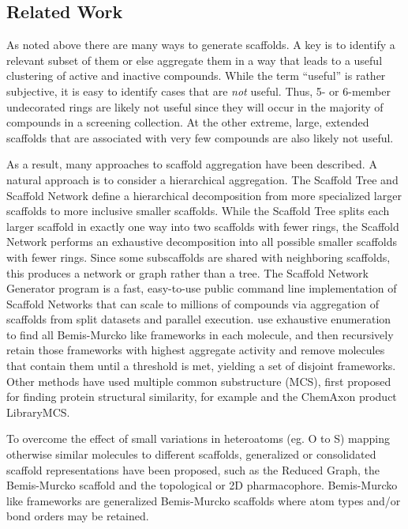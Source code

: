 \documentclass[journal=jacsat,manuscript=article]{achemso}
\begin{document}
\subsection{Related Work}
As noted above there are many ways to generate scaffolds. A key is to identify a
relevant subset of them or else aggregate them in a way that leads to a useful
clustering of active and inactive compounds. While the term ``useful'' is rather
subjective, it is easy to identify cases that are \emph{not} useful. Thus, 5- or
6-member undecorated rings are likely not useful since they will occur in the
majority of compounds in a screening collection. At the other extreme, large,
extended scaffolds that are associated with very few compounds are also likely
not useful.

As a result, many approaches to scaffold aggregation have been described. A
natural approach is to consider a hierarchical aggregation. The Scaffold
Tree\cite{Ertl2011ScaffoldTree} and Scaffold Network\cite{Varin2011ScafNet}
define a hierarchical decomposition from more specialized larger scaffolds to
more inclusive smaller scaffolds. While the Scaffold Tree splits each larger
scaffold in exactly one way into two scaffolds with fewer rings, the Scaffold
Network performs an exhaustive decomposition into all possible smaller scaffolds
with fewer rings.  Since some subscaffolds are shared with neighboring
scaffolds, this produces a network or graph rather than a tree. The Scaffold
Network Generator program\cite{Matlock2013SNG} is a fast, easy-to-use public
command line implementation of Scaffold Networks that can scale to millions of
compounds via aggregation of scaffolds from split datasets and parallel
execution.  \citeauthor{Harper2004DDclus} use exhaustive enumeration to find all
Bemis-Murcko like frameworks in each molecule, and then recursively retain those
frameworks with highest aggregate activity and remove molecules that contain
them until a threshold is met, yielding a set of disjoint frameworks.  Other
methods have used multiple common substructure (MCS), first proposed for finding
protein structural similarity\cite{Koch1997MCSprot}, for example
\cite{Quintus2009MCS} and the ChemAxon product LibraryMCS.

To overcome the effect of small variations in heteroatoms (eg. O to S) mapping
otherwise similar molecules to different scaffolds, generalized or consolidated
scaffold representations have been proposed, such as the Reduced
Graph\cite{Barker2003RG}, the Bemis-Murcko scaffold\cite{BemisMurcko1996} and
the topological or 2D pharmacophore\cite{Schneider1999ScafHopTP}. Bemis-Murcko
like frameworks \cite{Harper2004DDclus} are generalized Bemis-Murcko scaffolds
where atom types and/or bond orders may be retained.
\end{document}

